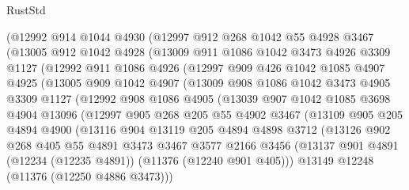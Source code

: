 \begin{lexlean}{RustStd}
\begin{coremodule}
{\begin{coremodule}
{{{{{{{{{{{{{{{{{{{{{{{{{{{{{{{{{{{{{{{{{{{{{{{{{{{{{{{{{{{{{{{{{{{{{{{{{{{{{{{{{{{{{    (@12992
      @914
      @1044
      @4930
      (@12997
        @912
        @268
        @1042
        @55
        @4928
        @3467
        (@13005
          @912
          @1042
          @4928
          (@13009
            @911
            @1086
            @1042
            @3473
            @4926
            @3309
            @1127
            (@12992
              @911
              @1086
              @4926
              (@12997
                @909
                @426
                @1042
                @1085
                @4907
                @4925
                (@13005
                  @909
                  @1042
                  @4907
                  (@13009
                    @908
                    @1086
                    @1042
                    @3473
                    @4905
                    @3309
                    @1127
                    (@12992
                      @908
                      @1086
                      @4905
                      (@13039
                        @907
                        @1042
                        @1085
                        @3698
                        @4904
                        @13096
                        (@12997
                          @905
                          @268
                          @205
                          @55
                          @4902
                          @3467
                          (@13109
                            @905
                            @205
                            @4894
                            @4900
                            (@13116
                              @904
                              @13119
                              @205
                              @4894
                              @4898
                              @3712
                              (@13126
                                @902
                                @268
                                @405
                                @55
                                @4891
                                @3473
                                @3467
                                @3577
                                @2166
                                @3456
                                (@13137
                                  @901
                                  @4891
                                  (@12234 (@12235 @4891))
                                  (@11376 (@12240 @901 @405)))
                                @13149
                                @12248
                                (@11376 (@12250 @4886 @3473)))
}}}}}}}}}}}}}}}}}}}}}}}}}}}}}}}}}}}}}}}}}}}}}}}}}}}}}}}}}}}}}}}}}}}}}}}}}}}}}}}}}}}}}
\end{coremodule}}
\end{coremodule}
\end{lexlean}

